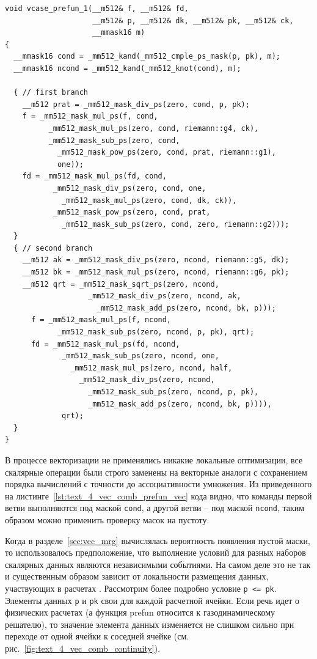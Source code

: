 \begin{singlespace}
\begin{lstlisting}[caption={Векторизованная версия функции \texttt{prefun} из состава римановского решателя.},label={lst:text_4_vec_comb_prefun_vec}]
void vcase_prefun_1(__m512& f, __m512& fd,
                    __m512& p, __m512& dk, __m512& pk, __m512& ck,
                    __mmask16 m)
{
  __mmask16 cond = _mm512_kand(_mm512_cmple_ps_mask(p, pk), m);
  __mmask16 ncond = _mm512_kand(_mm512_knot(cond), m);

  { // first branch
    __m512 prat = _mm512_mask_div_ps(zero, cond, p, pk);
    f = _mm512_mask_mul_ps(f, cond,
          _mm512_mask_mul_ps(zero, cond, riemann::g4, ck),
          _mm512_mask_sub_ps(zero, cond,
            _mm512_mask_pow_ps(zero, cond, prat, riemann::g1),
            one));
    fd = _mm512_mask_mul_ps(fd, cond,
           _mm512_mask_div_ps(zero, cond, one,
             _mm512_mask_mul_ps(zero, cond, dk, ck)),
           _mm512_mask_pow_ps(zero, cond, prat,
             _mm512_mask_sub_ps(zero, cond, zero, riemann::g2)));
  }
  { // second branch
    __m512 ak = _mm512_mask_div_ps(zero, ncond, riemann::g5, dk);
    __m512 bk = _mm512_mask_mul_ps(zero, ncond, riemann::g6, pk);
    __m512 qrt = _mm512_mask_sqrt_ps(zero, ncond,
                   _mm512_mask_div_ps(zero, ncond, ak,
                     _mm512_mask_add_ps(zero, ncond, bk, p)));
      f = _mm512_mask_mul_ps(f, ncond,
            _mm512_mask_sub_ps(zero, ncond, p, pk), qrt);
      fd = _mm512_mask_mul_ps(fd, ncond,
             _mm512_mask_sub_ps(zero, ncond, one,
               _mm512_mask_mul_ps(zero, ncond, half,
                 _mm512_mask_div_ps(zero, ncond,
                   _mm512_mask_sub_ps(zero, ncond, p, pk),
                   _mm512_mask_add_ps(zero, ncond, bk, p)))),
             qrt); 
  }
}                 
\end{lstlisting}
\end{singlespace}

В процессе векторизации не применялись никакие локальные оптимизации, все скалярные операции были строго заменены на векторные аналоги с сохранением порядка вычислений с точности до ассоциативности умножения.
Из приведенного на листинге~\ref{lst:text_4_vec_comb_prefun_vec} кода видно, что команды первой ветви выполняются под маской \texttt{cond}, а другой ветви -- под маской \texttt{ncond}, таким образом можно применить проверку масок на пустоту.

Когда в разделе~\ref{sec:vec_mrg} вычислялась вероятность появления пустой маски, то использовалось предположение, что выполнение условий для разных наборов скалярных данных являются независимыми событиями.
На самом деле это не так и существенным образом зависит от локальности размещения данных, участвующих в расчетах \cite{Rybakov2020VecMon}.
Рассмотрим более подробно условие \texttt{p <= pk}.
Элементы данных \texttt{p} и \texttt{pk} свои для каждой расчетной ячейки.
Если речь идет о физических расчетах (а функция prefun относится к газодинамическому решателю), то значение элемента данных изменяется не слишком сильно при переходе от одной ячейки к соседней ячейке (см. рис.~\ref{fig:text_4_vec_comb_continuity}).

